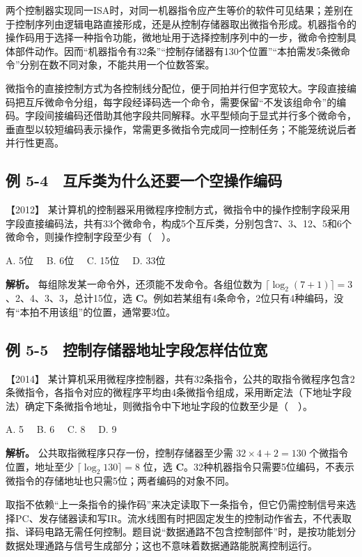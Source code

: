 两个控制器实现同一ISA时，对同一机器指令应产生等价的软件可见结果；差别在于控制序列由逻辑电路直接形成，还是从控制存储器取出微指令形成。机器指令的操作码用于选择一种指令功能，微地址用于选择控制序列中的一步，微命令控制具体部件动作。因而``机器指令有32条''``控制存储器有130个位置''``本拍需发5条微命令''分别在数不同对象，不能共用一个位数答案。

微指令的直接控制方式为各控制线分配位，便于同拍并行但字宽较大。字段直接编码把互斥微命令分组，每字段经译码选一个命令，需要保留``不发该组命令''的编码。字段间接编码还借助其他字段共同解释。水平型倾向于显式并行多个微命令，垂直型以较短编码表示操作，常需更多微指令完成同一控制任务；不能笼统说后者并行性更高。

\subsection{例 5-4　互斥类为什么还要一个空操作编码}\label{co-ex5-4}

\noindent{}【2012】 某计算机的控制器采用微程序控制方式，微指令中的操作控制字段采用字段直接编码法，共有33个微命令，构成5个互斥类，分别包含7、3、12、5和6个微命令，则操作控制字段至少有（　）。

A. 5位　 B. 6位　 C. 15位　 D. 33位


\textbf{解析。} 每组除发某一命令外，还须能不发命令。各组位数为 \(\lceil\log_2(7+1)\rceil=3\)、2、4、3、3，总计15位，选 \textbf{C}。例如若某组有4条命令，2位只有4种编码，没有``本拍不用该组''的位置，通常要3位。

\subsection{例 5-5　控制存储器地址字段怎样估位宽}\label{co-ex5-5}

\noindent{}【2014】 某计算机采用微程序控制器，共有32条指令，公共的取指令微程序包含2条微指令，各指令对应的微程序平均由4条微指令组成，采用断定法（下地址字段法）确定下条微指令地址，则微指令中下地址字段的位数至少是（　）。

A. 5　 B. 6　 C. 8　 D. 9


\textbf{解析。} 公共取指微程序只存一份，控制存储器至少需 \(32\times4+2=130\) 个微指令位置，地址至少 \(\lceil\log_2 130\rceil=8\) 位，选 \textbf{C}。32种机器指令只需要5位编码，不表示微指令的存储地址也只需5位；两者编码的对象不同。

取指不依赖``上一条指令的操作码''来决定读取下一条指令，但它仍需控制信号来选择PC、发存储器读和写IR。流水线图有时把固定发生的控制动作省去，不代表取指、译码电路无需任何控制。题目说``数据通路不包含控制部件''时，是按功能划分数据处理通路与信号生成部分；这也不意味着数据通路能脱离控制运行。


